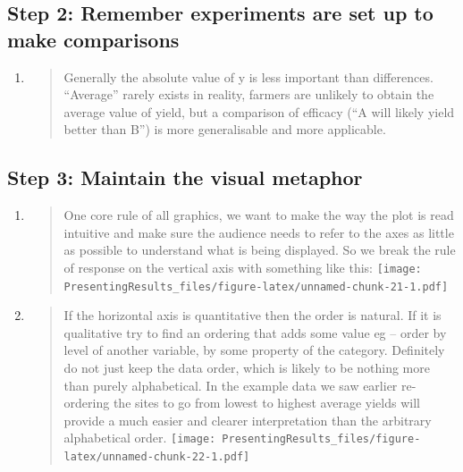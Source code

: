 \documentclass[
]{book}
\begin{document}
\hypertarget{step-2-remember-experiments-are-set-up-to-make-comparisons}{%
\subsection{Step 2: Remember experiments are set up to make comparisons}\label{step-2-remember-experiments-are-set-up-to-make-comparisons}}

\begin{enumerate}
\def\labelenumi{\alph{enumi}.}
\item
  \begin{quote}
  Generally the absolute value of y is less important than differences. ``Average'' rarely exists in reality, farmers are unlikely to obtain the average value of yield, but a comparison of efficacy (``A will likely yield better than B'') is more generalisable and more applicable.
  \end{quote}
\end{enumerate}

\hypertarget{step-3-maintain-the-visual-metaphor}{%
\subsection{Step 3: Maintain the visual metaphor}\label{step-3-maintain-the-visual-metaphor}}

\begin{enumerate}
\def\labelenumi{\alph{enumi}.}
\item
  \begin{quote}
  One core rule of all graphics, we want to make the way the plot is read intuitive and make sure the audience needs to refer to the axes as little as possible to understand what is being displayed. So we break the rule of response on the vertical axis with something like this:
  \texttt{[image: PresentingResults\_files/figure-latex/unnamed-chunk-21-1.pdf]}
  \end{quote}
\item
  \begin{quote}
  If the horizontal axis is quantitative then the order is natural. If it is qualitative try to find an ordering that adds some value eg -- order by level of another variable, by some property of the category. Definitely do not just keep the data order, which is likely to be nothing more than purely alphabetical. In the example data we saw earlier re-ordering the sites to go from lowest to highest average yields will provide a much easier and clearer interpretation than the arbitrary alphabetical order.
  \texttt{[image: PresentingResults\_files/figure-latex/unnamed-chunk-22-1.pdf]}
  \end{quote}
\end{enumerate}
\end{document}
